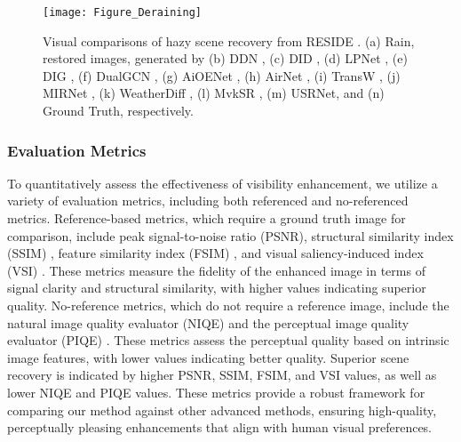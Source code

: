 \documentclass[final,12pt]{elsarticle}
\begin{document}
    \begin{figure*}[t]
        \centering
        \setlength{\abovecaptionskip}{0.cm}
        \texttt{[image: Figure\_Deraining]}
        \caption{Visual comparisons of hazy scene recovery from RESIDE \citep{li2018benchmarking}. (a) Rain, restored images, generated by (b) DDN \citep{fu2017removing}, (c) DID \citep{zhang2018density}, (d) LPNet \citep{fu2019lightweight}, (e) DIG \citep{ran2020single}, (f) DualGCN \citep{fu2021rain}, (g) AiOENet \citep{liu2023aioenet}, (h) AirNet \citep{li2022all}, (i) TransW \citep{valanarasu2022transweather}, (j) MIRNet \citep{zamir2022learning}, (k) WeatherDiff \citep{ozdenizci2023restoring}, (l) MvkSR \citep{xu2024mvksr}, (m) USRNet, and (n) Ground Truth, respectively.}
        \label{Figure_Deraining}
    \end{figure*}
\subsubsection{Evaluation Metrics}
     To quantitatively assess the effectiveness of visibility enhancement, we utilize a variety of evaluation metrics, including both referenced and no-referenced metrics. Reference-based metrics, which require a ground truth image for comparison, include peak signal-to-noise ratio (PSNR), structural similarity index (SSIM) \citep{wang2004image}, feature similarity index (FSIM) \citep{zhang2011fsim}, and visual saliency-induced index (VSI) \citep{zhang2014vsi}. These metrics measure the fidelity of the enhanced image in terms of signal clarity and structural similarity, with higher values indicating superior quality. No-reference metrics, which do not require a reference image, include the natural image quality evaluator (NIQE) \citep{mittal2012making} and the perceptual image quality evaluator (PIQE) \citep{venkatanath2015blind}. These metrics assess the perceptual quality based on intrinsic image features, with lower values indicating better quality. Superior scene recovery is indicated by higher PSNR, SSIM, FSIM, and VSI values, as well as lower NIQE and PIQE values. These metrics provide a robust framework for comparing our method against other advanced methods, ensuring high-quality, perceptually pleasing enhancements that align with human visual preferences.
\end{document}
